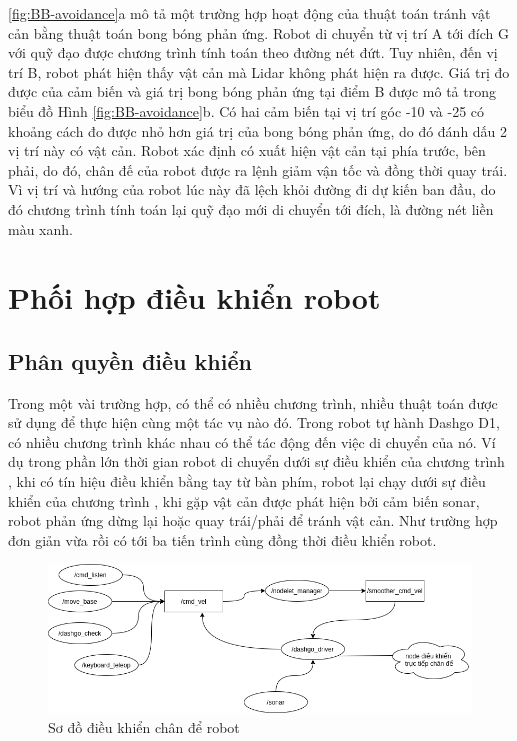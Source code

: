 \figurename{ \ref{fig:BB-avoidance}}a mô tả một trường hợp hoạt động của thuật toán tránh vật cản bằng thuật toán bong bóng phản ứng. Robot di chuyển từ vị trí A tới đích G với quỹ đạo được chương trình  tính toán theo đường nét đứt. Tuy nhiên, đến vị trí B, robot phát hiện thấy vật cản mà Lidar không phát hiện ra được. Giá trị đo được của cảm biến và giá trị bong bóng phản ứng tại điểm B được mô tả trong biểu đồ Hình \ref{fig:BB-avoidance}b. Có hai cảm biến tại vị trí góc -10 và -25 có khoảng cách đo được nhỏ hơn giá trị của bong bóng phản ứng, do đó đánh dấu 2 vị trí này có vật cản. Robot xác định có xuất hiện vật cản tại phía trước, bên phải, do đó, chân đế của robot được ra lệnh giảm vận tốc và đồng thời quay trái. Vì vị trí và hướng của robot lúc này đã lệch khỏi đường đi dự kiến ban đầu, do đó chương trình  tính toán lại quỹ đạo mới di chuyển tới đích, là đường nét liền màu xanh.

\section{Phối hợp điều khiển robot}

\subsection{Phân quyền điều khiển}
Trong một vài trường hợp, có thể có nhiều chương trình, nhiều thuật toán được sử dụng để thực hiện cùng một tác vụ nào đó. Trong robot tự hành Dashgo D1, có nhiều chương trình khác nhau có thể tác động đến việc di chuyển của nó. Ví dụ trong phần lớn thời gian robot di chuyển dưới sự điều khiển của chương trình , khi có tín hiệu điều khiển bằng tay từ bàn phím, robot lại chạy dưới sự điều khiển của chương trình , khi gặp vật cản được phát hiện bởi cảm biến sonar, robot phản ứng dừng lại hoặc quay trái/phải để tránh vật cản. Như trường hợp đơn giản vừa rồi có tới ba tiến trình cùng đồng thời điều khiển robot.

\begin{figure}[htbp]
    \centering
    \includegraphics[width=\linewidth]{figures/phanquyen-goc.png}
    \caption{Sơ đồ điều khiển chân để robot}
    \label{fig:phanquyen-goc}
\end{figure}

